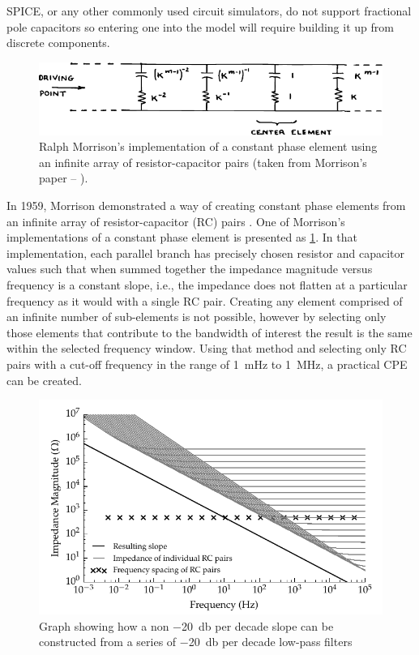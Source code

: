     SPICE, or any other commonly used circuit simulators, do not support fractional pole capacitors so entering one into the model will require building it up from discrete components.
    \begin{figure}[ht]
      \centering
      \includegraphics{content/pt2/07-InterfaceModel/graphics/Morrison-RC}
      \caption{\label{graph:pt2-morrisonCPE}Ralph Morrison's implementation of a constant phase element using an infinite array of resistor-capacitor pairs (taken from Morrison's paper -- \cite{Morrison1959}).}
    \end{figure}
    In 1959, Morrison demonstrated a way of creating constant phase elements from an infinite array of resistor-capacitor (RC) pairs \cite{Morrison1959}.
    One of Morrison's implementations of a constant phase element is presented as \cref{graph:pt2-morrisonCPE}.
    In that implementation, each parallel branch has precisely chosen resistor and capacitor values such that when summed together the impedance magnitude versus frequency is a constant slope, i.e., the impedance does not flatten at a particular frequency as it would with a single RC pair.
    Creating any element comprised of an infinite number of sub-elements is not possible, however by selecting only those elements that contribute to the bandwidth of interest the result is the same within the selected frequency window.
    Using that method and selecting only RC pairs with a cut-off frequency in the range of \SI{1}{\milli\hertz} to \SI{1}{\mega\hertz}, a practical CPE can be created.

    \begin{figure}
      \centering
      \includegraphics{content/pt2/07-InterfaceModel/graphics/graph_cpe_creation}
      \caption{\label{graph:pt2-cpe_creation}Graph showing how a non \SI{-20}{\decibel} per decade slope can be constructed from a series of \SI{-20}{\decibel} per decade low-pass filters}
    \end{figure}

